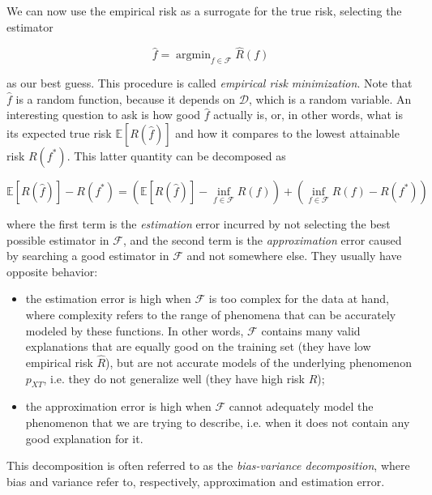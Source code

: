 \documentclass[a4paper,11pt]{kth-mag}
\DeclareMathOperator*{\argmin}{argmin}
\begin{document}
We can now use the empirical risk as a surrogate for the true risk, selecting the estimator

\begin{equation}
\label{eq:emp_risk_min}
\hat{f}=\argmin_{f\in\mathcal{F}}\hat{R}(f)
\end{equation}

\noindent as our best guess. This procedure is called \emph{empirical risk minimization}. Note that $\hat{f}$ is a random function, because it depends on $\mathcal{D}$, which is a random variable. An interesting question to ask is how good $\hat{f}$ actually is, or, in other words, what is its expected true risk $\mathbb{E}[R(\hat{f})]$ and how it compares to the lowest attainable risk $R(f^*)$. This latter quantity can be decomposed as

\begin{equation}
\mathbb{E}[R(\hat{f})]-R(f^*)=
\left(\mathbb{E}[R(\hat{f})]-\inf_{f\in\mathcal{F}} R(f)\right)
+\left(\inf_{f\in\mathcal{F}} R(f)-R(f^*)\right)
\end{equation}

\noindent where the first term is the \emph{estimation} error incurred by not selecting the best possible estimator in $\mathcal{F}$, and the second term is the \emph{approximation} error caused by searching a good estimator in $\mathcal{F}$ and not somewhere else. They usually have opposite behavior:

\begin{itemize}
\item the estimation error is high when $\mathcal{F}$ is too complex for the data at hand, where complexity refers to the range of phenomena that can be accurately modeled by these functions. In other words, $\mathcal{F}$ contains many valid explanations that are equally good on the training set (they have low empirical risk $\hat{R}$), but are not accurate models of the underlying phenomenon $p_{XT}$, i.e. they do not generalize well (they have high risk $R$);
\item the approximation error is high when $\mathcal{F}$ cannot adequately model the phenomenon that we are trying to describe, i.e. when it does not contain any good explanation for it.
\end{itemize}

This decomposition is often referred to as the \emph{bias-variance decomposition}, where bias and variance refer to, respectively, approximation and estimation error.
\end{document}
